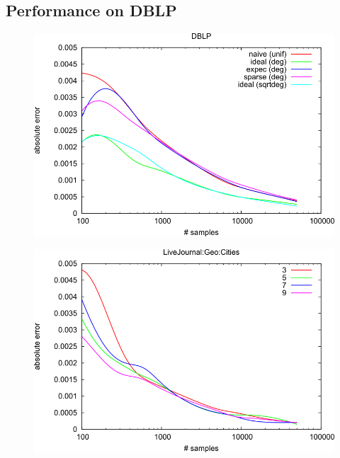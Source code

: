 \subsection{Performance on DBLP}
\begin{figure}[!ht]
  \begin{center}
    \includegraphics[width=0.5\linewidth]{fig4}
  \end{center}
\end{figure}

\begin{figure}[!ht]
  \begin{center}
    \includegraphics[width=0.5\linewidth]{fig7b}
  \end{center}
\end{figure}
